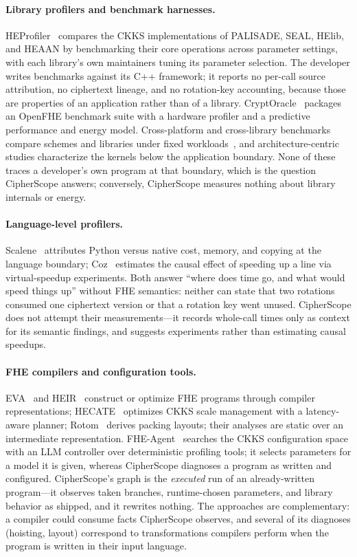 \documentclass[sigconf,nonacm]{acmart}
\begin{document}
\paragraph{Library profilers and benchmark harnesses.}
HEProfiler~\cite{takeshita2025heprofiler} compares the CKKS implementations
of PALISADE, SEAL, HElib, and HEAAN by benchmarking their core operations
across parameter settings, with each library's own maintainers tuning its
parameter selection. The developer writes benchmarks against its C++
framework; it reports no per-call source attribution, no ciphertext lineage,
and no rotation-key accounting, because those are properties of an
application rather than of a library.
CryptOracle~\cite{cryptoracle2025} packages an
OpenFHE benchmark suite with a hardware profiler and a predictive
performance and energy model. Cross-platform and cross-library benchmarks compare schemes and libraries
under fixed workloads~\cite{crossplatform2025,safetycentric2025}, and
architecture-centric studies characterize the kernels below the application
boundary. None of these traces a developer's own program at that boundary,
which is the question CipherScope answers; conversely, CipherScope measures
nothing about library internals or energy.

\paragraph{Language-level profilers.} Scalene~\cite{berger2023scalene}
attributes Python versus native cost, memory, and copying at the language
boundary; Coz~\cite{curtsinger2015coz} estimates the causal effect of
speeding up a line via virtual-speedup experiments. Both answer ``where
does time go, and what would speed things up'' without FHE semantics:
neither can state that two rotations consumed one ciphertext version or
that a rotation key went unused. CipherScope does not attempt their
measurements---it records whole-call times only as context for its semantic
findings, and suggests experiments rather than estimating causal speedups.

\paragraph{FHE compilers and configuration tools.}
EVA~\cite{dathathri2020eva} and HEIR~\cite{heir2025} construct or optimize
FHE programs through compiler representations; HECATE~\cite{hecate2022}
optimizes CKKS scale management with a latency-aware planner;
Rotom~\cite{rotom2026} derives packing layouts; their analyses are static
over an intermediate representation. FHE-Agent~\cite{fheagent2025} searches
the CKKS configuration space with an LLM controller over deterministic
profiling tools; it selects parameters for a model it is given, whereas
CipherScope diagnoses a program as written and configured. CipherScope's
graph is the \emph{executed} run of an already-written program---it
observes taken branches, runtime-chosen parameters, and library behavior as
shipped, and it rewrites nothing. The approaches are complementary: a
compiler could consume facts CipherScope observes, and several of its
diagnoses (hoisting, layout) correspond to transformations compilers
perform when the program is written in their input language.
\end{document}
